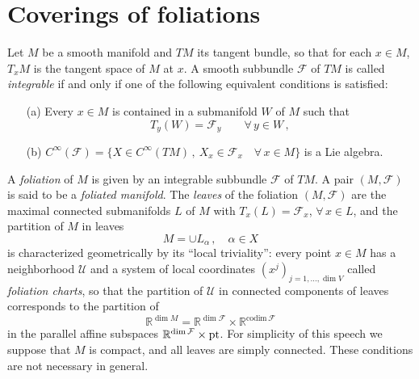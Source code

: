 \documentclass{beamer}
\theoremstyle{plain}
\newcommand{\sF}{\mathcal{F}}       %
\begin{document}
\section{Coverings of foliations}
\begin{frame}
\begin{definition}
	
	Let $M$ be a smooth manifold and $TM$ its tangent bundle, so that
	for each $x \in M$, $T_x M$ is the tangent space of $M$ at $x$. A
	smooth subbundle $\mathcal{F}$ of $TM$ is called {\it integrable} if and only if one of
	the following equivalent conditions is satisfied:
	
	\smallskip
	
	\begin{enumerate}
		
		\item[(a)] Every $x \in M$ is contained in a submanifold $W$ of $M$ such that
		$$
		T_y (W) = \mathcal{F}_y \qquad \forall \, y \in W \, ,
		$$
		
		\smallskip
		
		\item[(b)] $C^{\infty} \left( \mathcal{F}\right)  = \{ X \in C^{\infty} \left(TM\right) \, , \ X_x \in
		\mathcal{F}_x \quad \forall \, x \in M \}$ is a Lie algebra.
		
		\smallskip
		
	\end{enumerate}
	
\end{definition}


\end{frame}
\begin{frame}
A \textit{foliation} of $M$ is given by an integrable subbundle $\mathcal{F}$ of $TM$.  	A pair $\left(M, \sF\right)$ is said to be a \textit{foliated manifold}.
The \textit{leaves} of the foliation $\left(M , \mathcal F\right)$ are the maximal connected
submanifolds $L$ of $M$ with $T_x (L) = \mathcal{F}_x $, $\forall \, x \in L$,
and the partition of $M$ in leaves $$M = \cup
L_{\alpha}\,,\quad\alpha \in X$$ is characterized geometrically by
its ``local triviality'': every point $x \in M$ has a neighborhood
$\mathcal U$ and a system of local coordinates
$(x^j)_{j = 1 , \ldots , \dim V}$ called
{\it foliation charts}, so
that the partition of $\mathcal U$ in connected components of
leaves corresponds to the partition of 
\begin{equation*}
	{\mathbb
		R}^{\dim M} = {\mathbb R}^{\dim \mathcal F} \times {\mathbb R}^{\text{codim}
		\, \mathcal F}
\end{equation*}
in the parallel affine subspaces 
$
{\mathbb R}^{\dim \mathcal F}
\times {\rm pt}$.
For simplicity of this speech we suppose that $M$ is compact, and all leaves are simply connected. These conditions are not necessary in general.
\end{frame}
\end{document}
